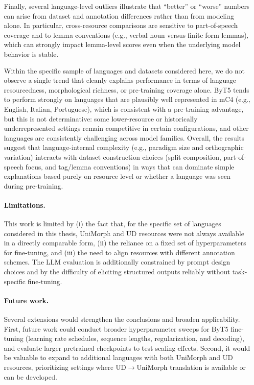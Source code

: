 Finally, several language-level outliers illustrate that ``better'' or ``worse'' numbers can arise from dataset and annotation differences rather than from modeling alone. In particular, cross-resource comparisons are sensitive to part-of-speech coverage and to lemma conventions (e.g., verbal-noun versus finite-form lemmas), which can strongly impact lemma-level scores even when the underlying model behavior is stable.

Within the specific sample of languages and datasets considered here, we do not observe a single trend that cleanly explains performance in terms of language resourcedness, morphological richness, or pre-training coverage alone. ByT5 tends to perform strongly on languages that are plausibly well represented in mC4 (e.g., English, Italian, Portuguese), which is consistent with a pre-training advantage, but this is not determinative: some lower-resource or historically underrepresented settings remain competitive in certain configurations, and other languages are consistently challenging across model families. Overall, the results suggest that language-internal complexity (e.g., paradigm size and orthographic variation) interacts with dataset construction choices (split composition, part-of-speech focus, and tag/lemma conventions) in ways that can dominate simple explanations based purely on resource level or whether a language was seen during pre-training.

\paragraph{Limitations.}
This work is limited by (i) the fact that, for the specific set of languages considered in this thesis, UniMorph and \ac{UD} resources were not always available in a directly comparable form, (ii) the reliance on a fixed set of hyperparameters for fine-tuning, and (iii) the need to align resources with different annotation schemes. The LLM evaluation is additionally constrained by prompt design choices and by the difficulty of eliciting structured outputs reliably without task-specific fine-tuning.

\paragraph{Future work.}
Several extensions would strengthen the conclusions and broaden applicability. First, future work could conduct broader hyperparameter sweeps for ByT5 fine-tuning (learning rate schedules, sequence lengths, regularization, and decoding), and evaluate larger pretrained checkpoints to test scaling effects. Second, it would be valuable to expand to additional languages with both UniMorph and \ac{UD} resources, prioritizing settings where \ac{UD}$\rightarrow$UniMorph translation is available or can be developed.


